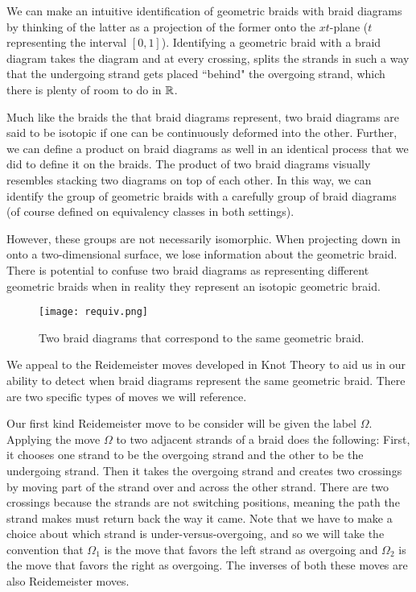We can make an intuitive identification of geometric braids with braid diagrams by thinking of the latter as a projection of the former onto the $xt$-plane ($t$ representing the interval $[0,1]$). Identifying a geometric braid with a braid diagram takes the diagram and at every crossing, splits the strands in such a way that the undergoing strand gets placed ``behind" the overgoing strand, which there is plenty of room to do in $\mathbb{R}$.

Much like the braids the that braid diagrams represent, two braid diagrams are said to be isotopic if one can be continuously deformed into the other. Further, we can define a product on braid diagrams as well in an identical process that we did to define it on the braids. The product of two braid diagrams visually resembles stacking two diagrams on top of each other. In this way, we can  identify the group of geometric braids with a carefully group of braid diagrams (of course defined on equivalency classes in both settings). 

However, these groups are not necessarily isomorphic. When projecting down in onto a two-dimensional surface, we lose information about the geometric braid. There is potential to confuse two braid diagrams as representing different geometric braids when in reality they represent an isotopic geometric braid.

\begin{figure}[H]
	\centering
	\texttt{[image: requiv.png]}
	\caption{Two braid diagrams that correspond to the same geometric braid.}
\end{figure}

We appeal to the Reidemeister moves developed in Knot Theory to aid us in our ability to detect when braid diagrams represent the same geometric braid. There are two specific types of moves we will reference.

Our first kind Reidemeister move to be consider will be given the label $\Omega$. Applying the move $\Omega$ to two adjacent strands of a braid does the following: First, it chooses one strand to be the overgoing strand and the other to be the undergoing strand. Then it takes the overgoing strand and creates two crossings by moving part of the strand over and across the other strand. There are two crossings because the strands are not switching positions, meaning the path the strand makes must return back the way it came. Note that we have to make a choice about which strand is under-versus-overgoing, and so we will take the convention that $\Omega_1$ is the move that favors the left strand as overgoing and $\Omega_2$ is the move that favors the right as overgoing. The inverses of both these moves are also Reidemeister moves.

